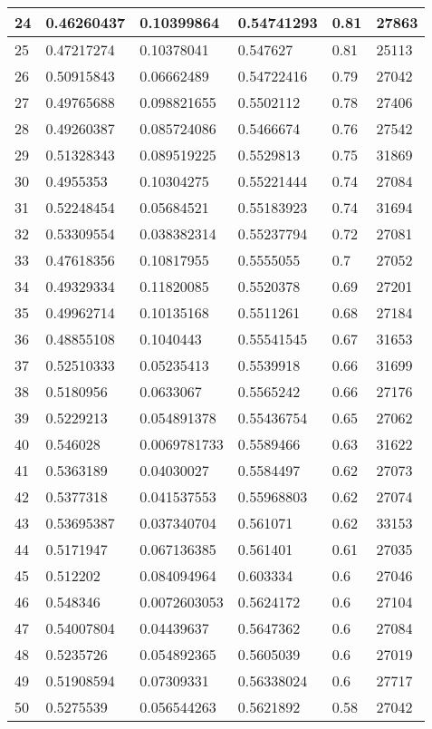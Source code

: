 \begin{longtable}{|l|l|l|l|l|l|}
24 & 0.46260437 & 0.10399864 & 0.54741293 & 0.81 & 27863 \\ \hline 
25 & 0.47217274 & 0.10378041 & 0.547627 & 0.81 & 25113 \\ \hline 
26 & 0.50915843 & 0.06662489 & 0.54722416 & 0.79 & 27042 \\ \hline 
27 & 0.49765688 & 0.098821655 & 0.5502112 & 0.78 & 27406 \\ \hline 
28 & 0.49260387 & 0.085724086 & 0.5466674 & 0.76 & 27542 \\ \hline 
29 & 0.51328343 & 0.089519225 & 0.5529813 & 0.75 & 31869 \\ \hline 
30 & 0.4955353 & 0.10304275 & 0.55221444 & 0.74 & 27084 \\ \hline 
31 & 0.52248454 & 0.05684521 & 0.55183923 & 0.74 & 31694 \\ \hline 
32 & 0.53309554 & 0.038382314 & 0.55237794 & 0.72 & 27081 \\ \hline 
33 & 0.47618356 & 0.10817955 & 0.5555055 & 0.7 & 27052 \\ \hline 
34 & 0.49329334 & 0.11820085 & 0.5520378 & 0.69 & 27201 \\ \hline 
35 & 0.49962714 & 0.10135168 & 0.5511261 & 0.68 & 27184 \\ \hline 
36 & 0.48855108 & 0.1040443 & 0.55541545 & 0.67 & 31653 \\ \hline 
37 & 0.52510333 & 0.05235413 & 0.5539918 & 0.66 & 31699 \\ \hline 
38 & 0.5180956 & 0.0633067 & 0.5565242 & 0.66 & 27176 \\ \hline 
39 & 0.5229213 & 0.054891378 & 0.55436754 & 0.65 & 27062 \\ \hline 
40 & 0.546028 & 0.0069781733 & 0.5589466 & 0.63 & 31622 \\ \hline 
41 & 0.5363189 & 0.04030027 & 0.5584497 & 0.62 & 27073 \\ \hline 
42 & 0.5377318 & 0.041537553 & 0.55968803 & 0.62 & 27074 \\ \hline 
43 & 0.53695387 & 0.037340704 & 0.561071 & 0.62 & 33153 \\ \hline 
44 & 0.5171947 & 0.067136385 & 0.561401 & 0.61 & 27035 \\ \hline 
45 & 0.512202 & 0.084094964 & 0.603334 & 0.6 & 27046 \\ \hline 
46 & 0.548346 & 0.0072603053 & 0.5624172 & 0.6 & 27104 \\ \hline 
47 & 0.54007804 & 0.04439637 & 0.5647362 & 0.6 & 27084 \\ \hline 
48 & 0.5235726 & 0.054892365 & 0.5605039 & 0.6 & 27019 \\ \hline 
49 & 0.51908594 & 0.07309331 & 0.56338024 & 0.6 & 27717 \\ \hline 
50 & 0.5275539 & 0.056544263 & 0.5621892 & 0.58 & 27042 \\ \hline 
\end{longtable}
